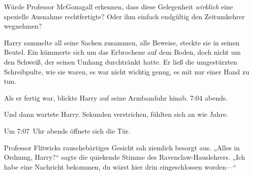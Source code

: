 Würde Professor McGonagall erkennen, dass diese Gelegenheit \emph{wirklich} eine spezielle Ausnahme rechtfertigte? Oder ihm einfach endgültig den Zeitumkehrer wegnehmen?

Harry sammelte all seine Sachen zusammen, alle Beweise, steckte sie in seinen Beutel. Ein  kümmerte sich um das Erbrochene auf dem Boden, doch nicht um den Schweiß, der seinen Umhang durchtränkt hatte. Er ließ die umgestürzten Schreibpulte, wie sie waren, es war nicht wichtig genug, es mit nur einer Hand zu tun.

Als er fertig war, blickte Harry auf seine Armbanduhr hinab. 7:04 abends.

Und dann wartete Harry. Sekunden verstrichen, fühlten sich an wie Jahre.

Um 7:07~Uhr abends öffnete sich die Tür.

Professor Flitwicks rauschebärtiges Gesicht sah ziemlich besorgt aus.
„Alles in Ordnung, Harry?“ sagte die quiekende Stimme des Ravenclaw-Hauslehrers.
„Ich habe eine Nachricht bekommen, du wärst hier drin eingeschlossen worden—“

